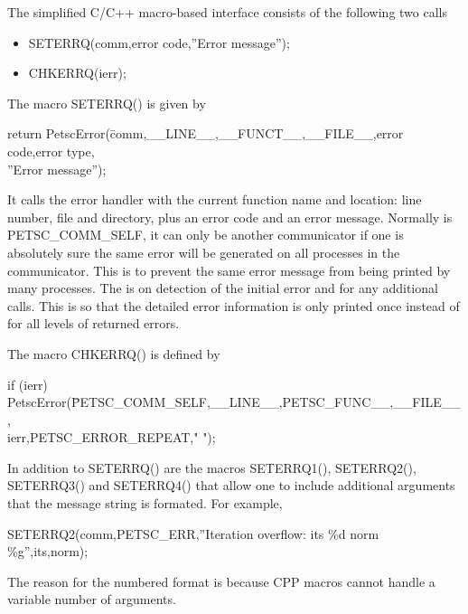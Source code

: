 \documentclass[twoside,12pt]{../sty/report_petsc}
\begin{document}
The simplified C/C++ macro-based interface consists of the following two calls
\begin{itemize}
\item SETERRQ(comm,error code,''Error message'');
\item CHKERRQ(ierr);
\end{itemize}

The macro SETERRQ() is given by
\begin{tabbing}
return PetscError(\=comm,\_\_LINE\_\_,\_\_FUNCT\_\_,\_\_FILE\_\_,error code,error type,\\
\> ''Error message'');
\end{tabbing}
It calls the error handler with the current function name and location: line number,
file and directory, plus an error code and an error message. Normally  is PETSC_COMM_SELF, it can only be another communicator if
one is absolutely sure the same error will be generated on all processes in the communicator. This is to prevent the same error message from
being printed by many processes. The  is  on detection of the initial error and  for any additional calls. This is so that
the detailed error information is only printed once instead of for all levels of returned errors.

The macro CHKERRQ() is defined by
\begin{tabbing}
  if (ierr)  PetscError(\=PETSC\_COMM\_SELF,\_\_LINE\_\_,PETSC\_FUNC\_\_,\_\_FILE\_\_, \\
 \>ierr,PETSC\_ERROR\_REPEAT," ");
\end{tabbing}

In addition to SETERRQ() are the macros SETERRQ1(), SETERRQ2(), SETERRQ3()
and SETERRQ4() that allow one to include additional arguments that the message
string is formated. For example,
\begin{tabbing}
  SETERRQ2(comm,PETSC\_ERR,''Iteration overflow: its \%d norm \%g'',its,norm);
\end{tabbing}
The reason for the numbered format is because CPP macros cannot handle a variable number
of arguments.
\end{document}
